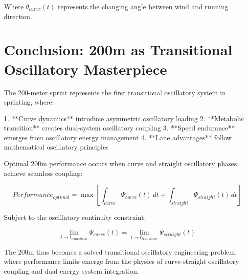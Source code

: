 \documentclass[12pt]{article}
\begin{document}
Where $\theta_{curve}(t)$ represents the changing angle between wind and running direction.

\section{Conclusion: 200m as Transitional Oscillatory Masterpiece}

The 200-meter sprint represents the first transitional oscillatory system in sprinting, where:

1. **Curve dynamics** introduce asymmetric oscillatory loading
2. **Metabolic transition** creates dual-system oscillatory coupling  
3. **Speed endurance** emerges from oscillatory energy management
4. **Lane advantages** follow mathematical oscillatory principles

Optimal 200m performance occurs when curve and straight oscillatory phases achieve seamless coupling:

\begin{equation}
Performance_{optimal} = \max\left[\int_{curve} \Psi_{curve}(t) \, dt + \int_{straight} \Psi_{straight}(t) \, dt\right]
\end{equation}

Subject to the oscillatory continuity constraint:

\begin{equation}
\lim_{t \to t_{transition}} \Psi_{curve}(t) = \lim_{t \to t_{transition}} \Psi_{straight}(t)
\end{equation}

The 200m thus becomes a solved transitional oscillatory engineering problem, where performance limits emerge from the physics of curve-straight oscillatory coupling and dual energy system integration.
\end{document}
